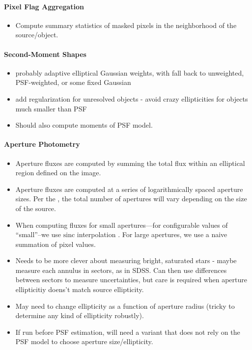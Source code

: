 \paragraph{Pixel Flag Aggregation}
\label{sec:acPixelFlags}
\begin{itemize}
\item Compute summary statistics of masked pixels in the neighborhood of the source/object.
\end{itemize}

\paragraph{Second-Moment Shapes}
\label{sec:acShapeAlgorithms}
\begin{itemize}
\item probably adaptive elliptical Gaussian weights, with fall back to unweighted, PSF-weighted, or some fixed Gaussian
\item add regularization for unresolved objects - avoid crazy ellipticities for objects much smaller than PSF
\item Should also compute moments of PSF model.
\end{itemize}

\paragraph{Aperture Photometry}
\label{sec:acAperturePhotometry}

\begin{itemize}
\item Aperture fluxes are computed by summing the total flux within an elliptical region defined on the image.
\item Aperture fluxes are computed at a series of logarithmically spaced aperture sizes. Per the \DPDD{}, the total number of apertures will vary depending on the size of the source.
\item When computing fluxes for small apertures---for configurable values of ``small''--we use $\mathrm{sinc}$ interpolation \cite{Bickerton13}. For large apertures, we use a naive summation of pixel values.
\item Needs to be more clever about measuring bright, saturated stars - maybe measure each annulus in sectors, as in SDSS.  Can then use differences between sectors to measure uncertainties, but care is required when aperture ellipticitiy doens't match source ellipticity.
\item May need to change ellipticity as a function of aperture radius (tricky to determine any kind of ellipticity robustly).
\item If run before PSF estimation, will need a variant that does not rely on the PSF model to choose aperture size/ellipticity.
\end{itemize}

